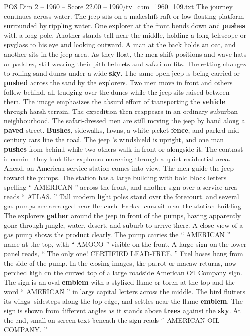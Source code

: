 \begin{textsample}{POS Dim 2 – 1960 – Score 22.00 – 1960/tv\_com\_1960\_109.txt}
The journey continues across water.
The jeep sits on a makeshift raft or low floating platform surrounded by rippling water.
One explorer at the front bends down and \textbf{pushes} with a long pole.
Another stands tall near the middle, holding a long telescope or spyglass to his eye and looking outward.
A man at the back holds an oar, and another sits in the jeep area.
As they float, the men shift positions and wave hats or paddles, still wearing their pith helmets and safari outfits.
The setting changes to rolling sand dunes under a wide \textbf{sky}.
The same open jeep is being carried or \textbf{pushed} across the sand by the explorers.
Two men move in front and others follow behind, all trudging over the dunes while the jeep sits raised between them.
The image emphasizes the absurd effort of transporting the \textbf{vehicle} through harsh terrain.
The expedition then reappears in an ordinary suburban neighbourhood.
The safari-dressed men are still moving the jeep by hand along a \textbf{paved} street. \textbf{Bushes}, sidewalks, lawns, a white picket \textbf{fence}, and parked mid-century cars line the road.
The jeep ’s windshield is upright, and one man \textbf{pushes} from behind while two others walk in front or alongside it.
The contrast is comic : they look like explorers marching through a quiet residential area.
Ahead, an American service station comes into view.
The men guide the jeep toward the pumps.
The station has a large building with bold block letters spelling “ AMERICAN ” across the front, and another sign over a service area reads “ ATLAS. ” Tall modern light poles stand over the forecourt, and several gas pumps are arranged near the curb.
Parked cars sit near the station building.
The explorers \textbf{gather} around the jeep in front of the pumps, having apparently gone through jungle, water, desert, and suburb to arrive there.
A close view of a gas pump shows the product clearly.
The pump carries the “ AMERICAN ” name at the top, with “ AMOCO ” visible on the front.
A large sign on the lower panel reads, “ The only one!
CERTIFIED LEAD-FREE. ” Fuel hoses hang from the side of the pump.
In the closing images, the parrot or macaw returns, now perched high on the curved top of a large roadside American Oil Company sign.
The sign is an oval \textbf{emblem} with a stylized flame or torch at the top and the word “ AMERICAN ” in large capital letters across the middle.
The bird flutters its wings, sidesteps along the top edge, and settles near the flame \textbf{emblem}.
The sign is shown from different angles as it stands above \textbf{trees} against the \textbf{sky}.
At the end, small on-screen text beneath the sign reads “ AMERICAN OIL COMPANY. ”

\end{textsample}

